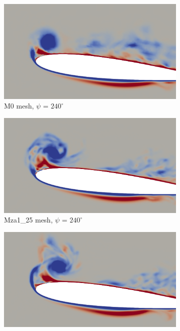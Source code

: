 \begin{figure}[H]
	\centering
	\begin{center}
		\begin{subfigure}[b]{0.475\textwidth}
		\centering
		\includegraphics[width=1\textwidth]{figures/zonal_adapt_results/vorticity_plots/v2/M0/spavg/phase_240.png}
		\caption{M0 mesh, $\psi$ = $240^\circ$}
		\label{fig:M0_sp_psi240}
		\end{subfigure}
	\end{center}
	\begin{subfigure}[b]{0.475\textwidth}
		\centering
		\includegraphics[width=1\textwidth]{figures/zonal_adapt_results/vorticity_plots/v2/Mza1_25/spavg/phase_240.png}
		\caption{Mza1\_25 mesh, $\psi$ = $240^\circ$}
		\label{fig:Mza1_25_sp_psi240}
	\end{subfigure}
	\begin{subfigure}[b]{0.475\textwidth}
	\centering
	\includegraphics[width=1\textwidth]{figures/zonal_adapt_results/vorticity_plots/v2/Mza1_50/spavg/phase_240.png}

\end{subfigure}
\end{figure}
